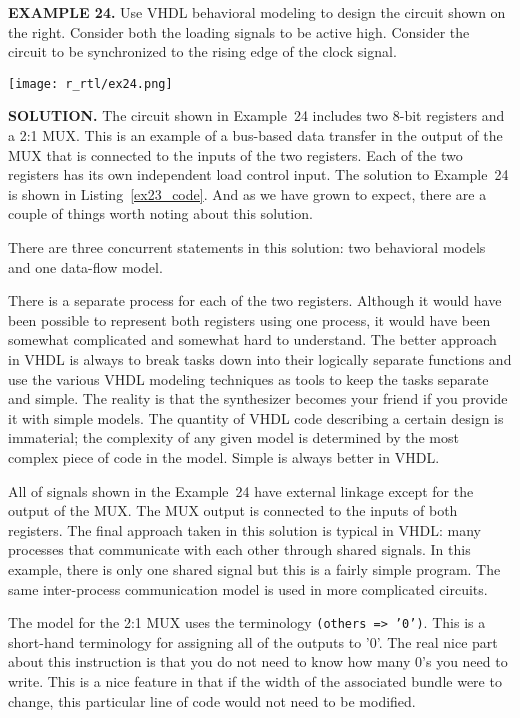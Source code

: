 \begin{leftbar}
\begin{minipage}[t]{0.5\textwidth}
\vspace{10pt}
\noindent
\textbf{EXAMPLE 24.}
Use VHDL behavioral modeling to design the circuit shown on the right. Consider both the loading signals to be active high. Consider the circuit to be synchronized to the rising edge of the clock signal.
\end{minipage}
\begin{minipage}[t]{0.5\textwidth}
\vspace{0pt}\raggedright
    \centering
	\texttt{[image: r\_rtl/ex24.png]}
\end{minipage}
\end{leftbar}
\noindent
\textbf{SOLUTION.} The circuit shown in Example~24 includes two 8-bit registers and a 2:1 MUX. This is an example of a bus-based data transfer in the output of the MUX that is connected to the inputs of the two registers. Each of the two registers has its own independent load control input. The solution to Example~24 is shown in Listing~\ref{ex23_code}. And as we have grown to expect, there are a couple of things worth noting about this solution.
\begin{my_list}
\item There are three concurrent statements in this solution: two behavioral models and one data-flow model.

\item There is a separate process for each of the two registers. Although it would have been possible to represent both registers using one process, it would have been somewhat complicated and somewhat hard to understand. The better approach in VHDL is always to break tasks down into their logically separate functions and use the various VHDL modeling techniques as tools to keep the tasks separate and simple. The reality is that the synthesizer becomes your friend if you provide it with simple models. The quantity of VHDL code describing a certain design is immaterial; the complexity of any given model is determined by the most complex piece of code in the model. Simple is always better in VHDL.

\item All of signals shown in the Example~24 have external linkage except for the output of the MUX. The MUX output is connected to the inputs of both registers. The final approach taken in this solution is typical in VHDL: many processes that communicate with each other through shared signals. In this example, there is only one shared signal but this is a fairly simple program. The same inter-process communication model is used in more complicated circuits.

\item The model for the 2:1 MUX uses the terminology \texttt{(others => '0')}. This is a short-hand terminology for assigning all of the outputs to '0'. The real nice part about this instruction is that you do not need to know how many 0’s you need to write. This is a nice feature in that if the width of the associated bundle were to change, this particular line of code would not need to be modified.
\end{my_list}


